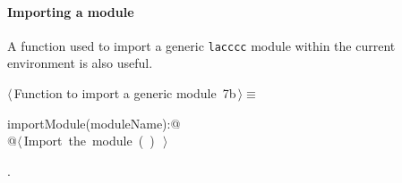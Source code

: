 \documentclass[11pt,oneside]{article}	%
\begin{document}
\paragraph{Importing a module} A function used to import a generic \texttt{lacccc} module within the current environment is also useful.
\begin{flushleft} \small
\begin{minipage}{\linewidth} \label{scrap16}
\protect{}$\langle\,$Function to import a generic module\nobreak\ {\footnotesize 7b}$\,\rangle\equiv$
\vspace{-1ex}
\begin{list}{}{} \item
\mbox{}\verb@def importModule(moduleName):@\\
\mbox{}\verb@   @\hbox{$\langle\,$Import the module\nobreak\ ({\footnotesize {}\label{scrap17}
 }\mbox{}\verb@moduleName@ ) {\footnotesize {}}$\,\rangle$}\verb@@\\
\mbox{}\verb@@{\NWsep}
\end{list}
\vspace{-1ex}
\footnotesize\addtolength{\baselineskip}{-1ex}
\begin{list}{}{\setlength{\itemsep}{-\parsep}\setlength{\itemindent}{-\leftmargin}}
\item {\NWtxtMacroNoRef}.
\end{list}
\end{minipage}\\[4ex]
\end{flushleft}




\end{document}
